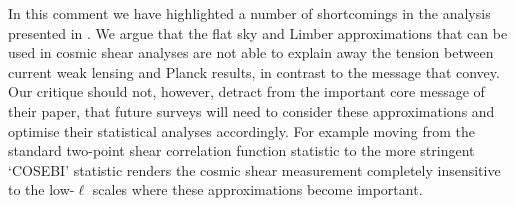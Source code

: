 In this comment we have highlighted a number of shortcomings in the analysis presented in \cite{kitching/etal:2016}.  We argue that the flat sky and Limber approximations that can be used in cosmic shear analyses are not able to explain away the tension between current weak lensing and Planck results, in contrast to the message that \cite{kitching/etal:2016} convey.  Our critique should not, however, detract from the important core message of their paper, that future surveys will need to consider these approximations and optimise their statistical analyses accordingly.  For example moving from the standard two-point shear correlation function statistic to the more stringent `COSEBI' statistic \citep{schneider/etal:2010} renders the cosmic shear measurement completely insensitive to the low-$\ell$ scales where these approximations become important.  


